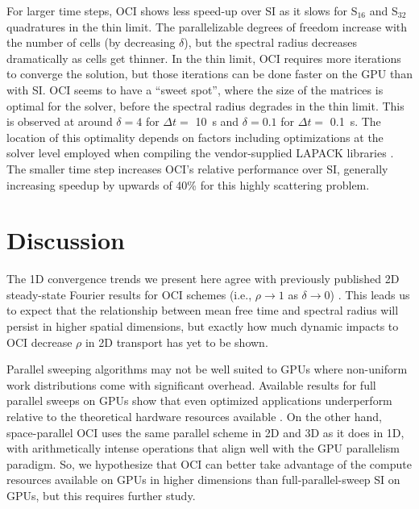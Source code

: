 For larger time steps, OCI shows less speed-up over SI as it slows for S$_{16}$ and S$_{32}$ quadratures in the thin limit.
The parallelizable degrees of freedom increase with the number of cells (by decreasing $\delta$), but the spectral radius decreases dramatically as cells get thinner.
In the thin limit, OCI requires more iterations to converge the solution, but those iterations can be done faster on the GPU than with SI.
OCI seems to have a ``sweet spot'', where the size of the matrices is optimal for the solver, before the spectral radius degrades in the thin limit.
This is observed at around $\delta=4$ for $\Delta t=$ \SI{10}{\s} and $\delta=0.1$ for $\Delta t=$ \SI{0.1}{\s}.
The location of this optimality depends on factors including optimizations at the solver level employed when compiling the vendor-supplied LAPACK libraries \cite{rocsolver}.
The smaller time step increases OCI's relative performance over SI, generally increasing speedup by upwards of 40\% for this highly scattering problem.

\section{Discussion}

The 1D convergence trends we present here agree with
previously published 2D steady-state Fourier results for OCI schemes 
(i.e., $\rho\rightarrow1$ as $\delta\rightarrow0$) \cite{rosa_cellwise_2013, man1994parallel}.
This leads us to expect that the relationship between mean free time and spectral radius will persist in higher spatial dimensions, 
but exactly how much dynamic impacts to OCI decrease $\rho$ in 2D transport has yet to be shown.

Parallel sweeping algorithms may not be well suited to GPUs where non-uniform work distributions come with significant overhead. 
Available results for full parallel sweeps on GPUs show that even optimized applications underperform relative to the theoretical hardware resources available \cite{Thomas_2024_profiling, wolfe2022roofline, kunen_kripke_2015, womeldorff_taking_2017, zerr_partisn_2019}.
On the other hand, space-parallel OCI uses the same parallel scheme in 2D and 3D as it does in 1D, with arithmetically intense operations that align well with the GPU parallelism paradigm.
So, we hypothesize that OCI can better take advantage of the compute resources available on GPUs in higher dimensions than full-parallel-sweep SI on GPUs, but this requires further study.

